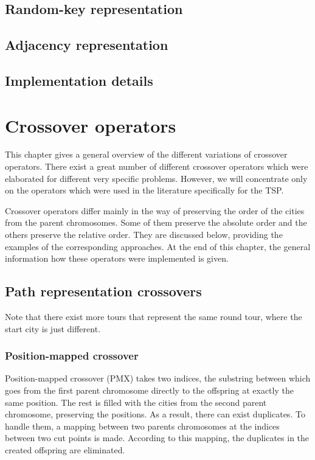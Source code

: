 \documentclass[a4paper, 12pt, headings=standardclasses]{scrartcl}
\begin{document}
\subsection{Random-key representation}
\subsection{Adjacency representation}
\subsection{Implementation details}


\section{Crossover operators}
\label{sec:crossover}
This chapter gives a general overview of the different variations of crossover operators. There exist a great number of different crossover operators which were elaborated for different very specific problems. However, we will concentrate  only on the operators which were used in the literature specifically for the TSP. \par
Crossover operators differ mainly in the way of preserving the order of the cities from the parent chromosomes. Some of them preserve the absolute order and the others preserve the relative order. They are discussed below, providing the examples of the corresponding approaches. At the end of this chapter, the general information  how these operators were implemented is given.

\subsection{Path representation crossovers}

Note that there exist more tours that represent the same round tour, where the start city is just different.
\subsubsection{Position-mapped crossover }
\label{subsec:pmx}
Position-mapped crossover (PMX) takes two indices, the substring between which goes from the first parent chromosome directly to the offspring at exactly the same position. The rest is filled with the cities from the second parent chromosome, preserving the positions. As a result, there can exist duplicates. To handle them, a mapping between two parents chromosomes at the indices between two cut points is made. According to this mapping, the duplicates in the created offspring are eliminated. \par
\end{document}

